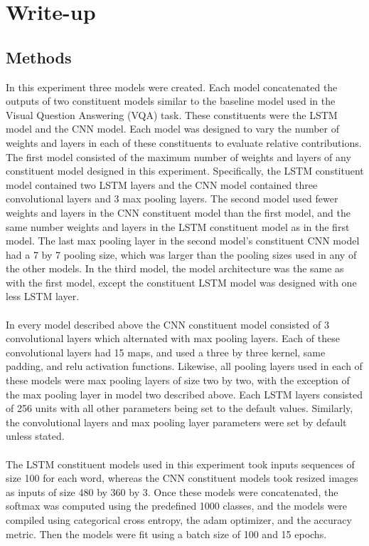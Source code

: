 \documentclass[12pt]{article}
\begin{document}
\section{Write-up}
\subsection{Methods}
In this experiment three models were created. Each model concatenated the outputs of two constituent models similar to the baseline model used in the Visual Question Answering (VQA) task. These constituents were the LSTM model and the CNN model. Each model was designed to vary the number of weights and layers in each of these constituents to evaluate relative contributions. The first model consisted of the maximum number of weights and layers of any constituent model designed in this experiment. Specifically, the LSTM constituent model contained two LSTM layers and the CNN model contained three convolutional layers and 3 max pooling layers. The second model used fewer weights and layers in the CNN constituent model than the first model, and the same number weights and layers in the LSTM constituent model as in the first model. The last max pooling layer in the second model's constituent CNN model had a 7 by 7 pooling size, which was larger than the pooling sizes used in any of the other models. In the third model, the model architecture was the same as with the first model, except the constituent LSTM model was designed with one less LSTM layer.\\
\\
In every model described above the CNN constituent model consisted of 3 convolutional layers which alternated with max pooling layers. Each of these convolutional layers had 15 maps, and used a three by three kernel, same padding, and relu activation functions. Likewise, all pooling layers used in each of these models were max pooling layers of size two by two, with the exception of the max pooling layer in model two described above. Each LSTM layers consisted of 256 units with all other parameters being set to the default values. Similarly, the convolutional layers and max pooling layer parameters were set by default unless stated.\\
\\
The LSTM constituent models used in this experiment took inputs sequences of size 100 for each word, whereas the CNN constituent models took resized images as inputs of size 480 by 360 by 3. Once these models were concatenated, the softmax was computed using the predefined 1000 classes, and the models were compiled using categorical cross entropy, the adam optimizer, and the accuracy metric. Then the models were fit using a batch size of 100 and 15 epochs.\\
\end{document}
